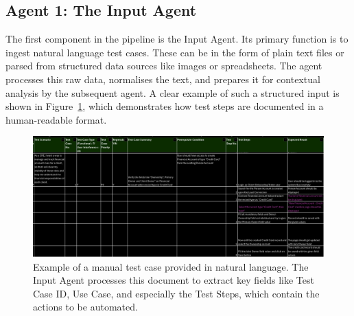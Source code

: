 \documentclass{article}
\begin{document}
\subsection{Agent 1: The Input Agent}
The first component in the pipeline is the Input Agent. Its primary function is to ingest natural language test cases. These can be in the form of plain text files or parsed from structured data sources like images or spreadsheets. The agent processes this raw data, normalises the text, and prepares it for contextual analysis by the subsequent agent. A clear example of such a structured input is shown in Figure~\ref{fig:testcase1}, which demonstrates how test steps are documented in a human-readable format.

\begin{figure}[h!]
    \centering
    \includegraphics[width=1\textwidth]{images/testCase1.png}
    \caption{Example of a manual test case provided in natural language. The Input Agent processes this document to extract key fields like Test Case ID, Use Case, and especially the Test Steps, which contain the actions to be automated.}
    \label{fig:testcase1}
\end{figure}
\end{document}
